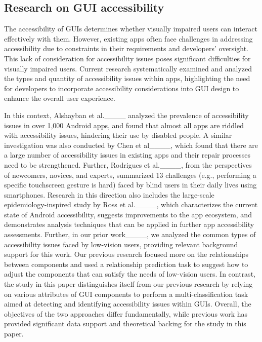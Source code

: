 \subsection{Research on GUI accessibility}

The accessibility of GUIs determines whether visually impaired users can interact effectively with them.
However, existing apps often face challenges in addressing accessibility due to constraints in their requirements and developers' oversight. 
This lack of consideration for accessibility issues poses significant difficulties for visually impaired users. 
Current research systematically examined and analyzed the types and quantity of accessibility issues within apps, highlighting the need for developers to incorporate accessibility considerations into GUI design to enhance the overall user experience. 

In this context, Alshayban et al.____ analyzed the prevalence of accessibility issues in over 1,000 Android apps, and found that almost all apps are riddled with accessibility issues, hindering their use by disabled people. 
A similar investigation was also conducted by Chen et al____, which found that there are a large number of accessibility issues in existing apps and their repair processes need to be strengthened.
Further, Rodrigues et al.____, from the perspectives of newcomers, novices, and experts, summarized 13 challenges (e.g., performing a specific touchscreen gesture is hard) faced by blind users in their daily lives using smartphones.
Research in this direction also includes the large-scale epidemiology-inspired study by Ross et al.____, which characterizes the current state of Android accessibility, suggests improvements to the app ecosystem, and demonstrates analysis techniques that can be applied in further app accessibility assessments.
Further, in our prior work____, we analyzed the common types of accessibility issues faced by low-vision users, providing relevant background support for this work. 
Our previous research focused more on the relationships between components and used a relationship prediction task to suggest how to adjust the components that can satisfy the needs of low-vision users.
In contrast, the study in this paper distinguishes itself from our previous research by relying on various attributes of GUI components to perform a multi-classification task aimed at detecting and identifying accessibility issues within GUIs.
Overall, the objectives of the two approaches differ fundamentally, while previous work has provided significant data support and theoretical backing for the study in this paper.

